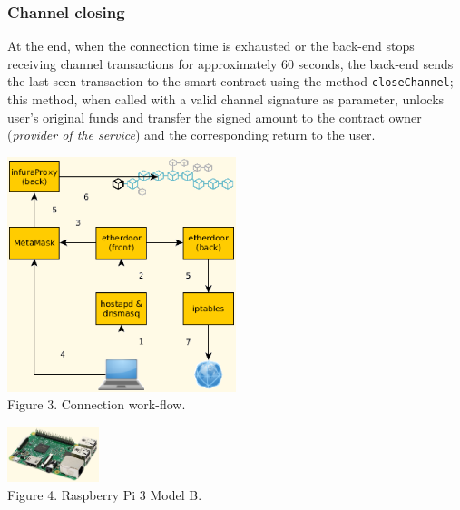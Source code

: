 \documentclass[12pt]{amsart}
\begin{document}
\begin{multicols}{2}
\subsubsection{Channel closing}
At the end, when the connection time is exhausted or the back-end
stops receiving channel transactions for approximately 60 seconds,
the back-end sends the last seen transaction to the smart contract
using the method \texttt{closeChannel}; this method, when called
with a valid channel signature as parameter, unlocks user's original
funds and transfer the signed amount to the contract owner
(\textit{provider of the service}) and the corresponding return
to the user.

\begin{center}
  \includegraphics[keepaspectratio, width=0.5\textwidth]{images/con-flow-y.eps}
\\
Figure 3. Connection work-flow.
\\
\end{center}

\begin{center}
  \includegraphics[keepaspectratio, width=0.2\textwidth]{images/rpi3modelb-sourceamazon.eps}
\\
Figure 4. Raspberry Pi 3 Model B.
\\
\end{center}


\end{multicols}
\end{document}
